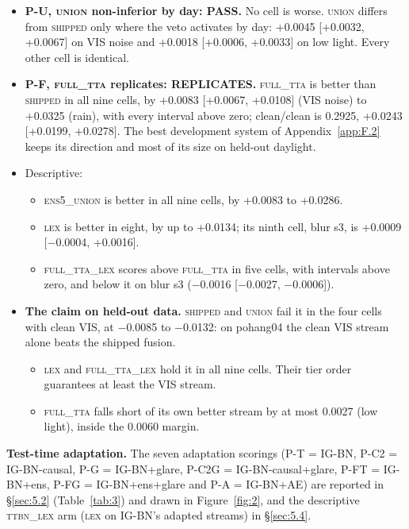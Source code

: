 \documentclass[10pt]{article}
\begin{document}
\begin{itemize}
\item \textbf{P-U, \textsc{union} non-inferior by day: PASS.} No cell is worse. \textsc{union} differs from \textsc{shipped} only where the veto activates by day: +0.0045 [+0.0032, +0.0067] on VIS noise and +0.0018 [+0.0006, +0.0033] on low light. Every other cell is identical.
\item \textbf{P-F, \textsc{full\_tta} replicates: REPLICATES.} \textsc{full\_tta} is better than \textsc{shipped} in all nine cells, by +0.0083 [+0.0067, +0.0108] (VIS noise) to +0.0325 (rain), with every interval above zero; clean/clean is 0.2925, +0.0243 [+0.0199, +0.0278]. The best development system of Appendix~\ref{app:F.2} keeps its direction and most of its size on held-out daylight.
\item Descriptive:
\begin{itemize}
\item \textsc{ens5\_union} is better in all nine cells, by +0.0083 to +0.0286.
\item \textsc{lex} is better in eight, by up to +0.0134; its ninth cell, blur s3, is +0.0009 [$-$0.0004, +0.0016].
\item \textsc{full\_tta\_lex} scores above \textsc{full\_tta} in five cells, with intervals above zero, and below it on blur s3 ($-$0.0016 [$-$0.0027, $-$0.0006]).
\end{itemize}
\item \textbf{The claim on held-out data.} \textsc{shipped} and \textsc{union} fail it in the four cells with clean VIS, at $-$0.0085 to $-$0.0132: on pohang04 the clean VIS stream alone beats the shipped fusion.
\begin{itemize}
\item \textsc{lex} and \textsc{full\_tta\_lex} hold it in all nine cells. Their tier order guarantees at least the VIS stream.
\item \textsc{full\_tta} falls short of its own better stream by at most 0.0027 (low light), inside the 0.0060 margin.
\end{itemize}
\end{itemize}

\textbf{Test-time adaptation.} The seven adaptation scorings (P-T = IG-BN, P-C2 = IG-BN-causal, P-G = IG-BN+glare, P-C2G = IG-BN-causal+glare, P-FT = IG-BN+ens, P-FG = IG-BN+ens+glare and P-A = IG-BN+AE) are reported in \S\ref{sec:5.2} (Table~\ref{tab:3}) and drawn in Figure~\ref{fig:2}, and the descriptive \textsc{ttbn\_lex} arm (\textsc{lex} on IG-BN's adapted streams) in \S\ref{sec:5.4}.
\end{document}
